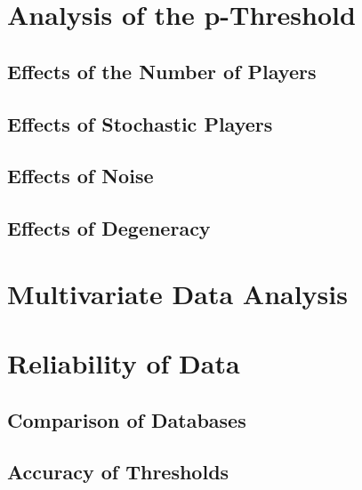 \section{Analysis of the p-Threshold}

\subsection{Effects of the Number of Players}

\subsection{Effects of Stochastic Players}

\subsection{Effects of Noise}

\subsection{Effects of Degeneracy}

\section{Multivariate Data Analysis}

\section{Reliability of Data}

\subsection{Comparison of Databases}

\subsection{Accuracy of Thresholds}